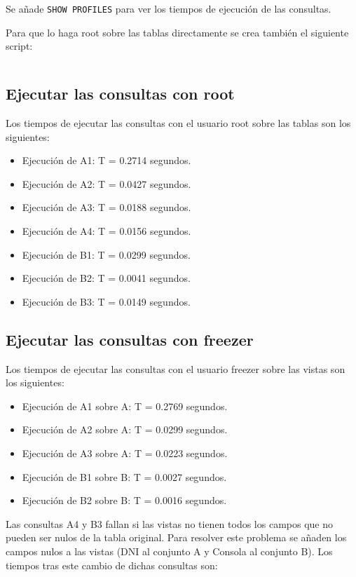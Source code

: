 \documentclass[a4paper, 11pt, oneside]{article} %
\newcommand{\scriptdir}{../scripts/} %
\begin{document}
Se añade \texttt{SHOW PROFILES} para ver los tiempos de ejecución de las consultas.

Para que lo haga root sobre las tablas directamente se crea también el siguiente script:

\inputminted{mysql}{\scriptdir scripts_consulta_privilegios/root_queries.sql}

\subsection{Ejecutar las consultas con root}

Los tiempos de ejecutar las consultas con el usuario root sobre las tablas son los siguientes:

\begin{itemize}
	\item Ejecución de A1: T = 0.2714 segundos.
	\item Ejecución de A2: T = 0.0427 segundos.
	\item Ejecución de A3: T = 0.0188 segundos.
	\item Ejecución de A4: T = 0.0156 segundos.
	\item Ejecución de B1: T = 0.0299 segundos.
	\item Ejecución de B2: T = 0.0041 segundos.
	\item Ejecución de B3: T = 0.0149 segundos.
\end{itemize}

\subsection{Ejecutar las consultas con freezer}

Los tiempos de ejecutar las consultas con el usuario freezer sobre las vistas son los siguientes:

\begin{itemize}
	\item Ejecución de A1 sobre A: T = 0.2769 segundos.
	\item Ejecución de A2 sobre A: T = 0.0299 segundos.
	\item Ejecución de A3 sobre A: T = 0.0223 segundos.
	\item Ejecución de B1 sobre B: T = 0.0027 segundos.
	\item Ejecución de B2 sobre B: T = 0.0016 segundos.
\end{itemize}

Las consultas A4 y B3 fallan si las vistas no tienen todos los campos que no pueden ser nulos de la tabla original. Para resolver este problema se añaden los campos nulos a las vistas (DNI al conjunto A y Consola al conjunto B). Los tiempos tras este cambio de dichas consultas son:
\end{document}
